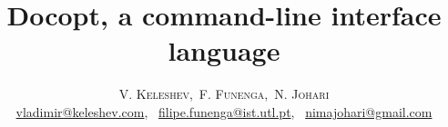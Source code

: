 \documentclass[twoside]{article}
\title{\vspace{-15mm}\fontsize{24pt}{10pt}\selectfont\textbf
       {Docopt, a command-line interface language}}
\author{\large \textsc{V. Keleshev},~\textsc{F. Funenga},~\textsc{N. Johari}
        \\[2mm]
        \normalsize \href{mailto:vladimir@keleshev.com}
                         {vladimir@keleshev.com},~
                    \href{mailto:filipe.funenga@ist.utl.pt}
                         {filipe.funenga@ist.utl.pt},~
                    \href{mailto:nimajohari@gmail.com}
                         {nimajohari@gmail.com}
        \vspace{-5mm}}
\date{}
\begin{document}
\maketitle
\thispagestyle{fancy}

\begin{multicols}{2}








\end{multicols}
\end{document}
